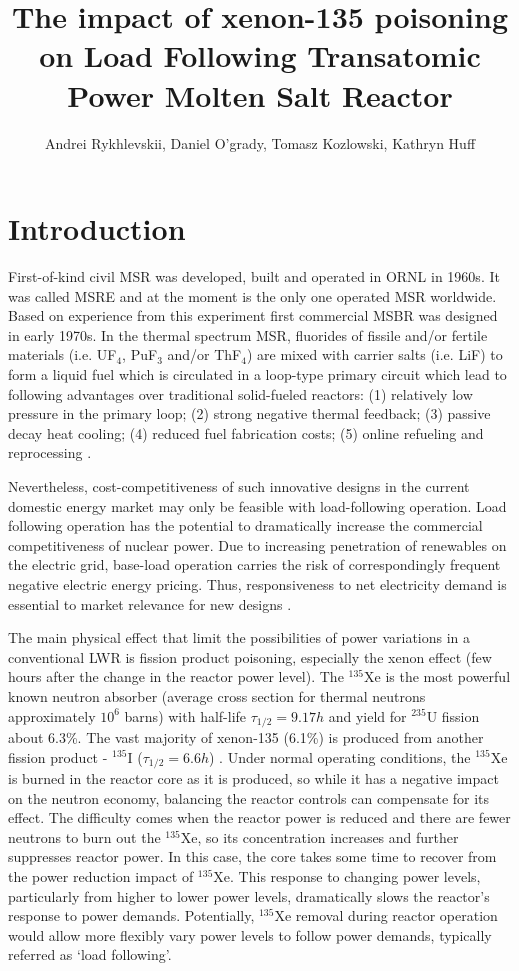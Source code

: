 \documentclass{anstrans}
\title{The impact of xenon-135 poisoning on Load Following Transatomic Power 
Molten Salt Reactor}
\author{Andrei Rykhlevskii, Daniel O'grady, Tomasz Kozlowski, Kathryn Huff}
\institute{
        Department of Nuclear, Plasma, and Radiological Engineering, University 
        of Illinois at Urbana-Champaign \break
        Urbana, IL
}
\begin{document}
\section{Introduction}
First-of-kind civil \gls{MSR} was developed, built and operated in \gls{ORNL}  
in 1960s. It was called \gls{MSRE} and at the moment is the
only one operated 
\gls{MSR} worldwide. Based on experience from this experiment first commercial
\gls{MSBR} was designed in early 1970s. In the thermal spectrum \gls{MSR}, 
fluorides of fissile and/or fertile materials (i.e.
UF$_4$, PuF$_3$ and/or 
ThF$_4$) are mixed with carrier salts (i.e. LiF) to form a liquid fuel
which 
is circulated in a loop-type primary circuit which lead to following 
advantages over traditional solid-fueled reactors: (1) relatively low pressure 
in the primary loop; (2) strong negative thermal feedback; (3) passive decay 
heat cooling; (4) reduced fuel fabrication costs; (5) online refueling and 
reprocessing \cite{haubenreich_experience_1970}.

Nevertheless, cost-competitiveness of such innovative designs in the current 
domestic energy market may only be feasible with load-following operation. 
Load following operation has the potential to dramatically increase the 
commercial competitiveness of nuclear power. Due to increasing penetration of 
renewables on the electric grid, base-load operation carries the risk of 
correspondingly frequent negative electric energy pricing. Thus, 
responsiveness to net electricity demand is essential to market relevance for
new designs \cite{energy_information_administration_u.s._2016}.

The main physical effect that limit the possibilities of power variations in a 
conventional \gls{LWR} is fission product poisoning, especially the xenon  
effect (few hours after the change in the reactor power level).  The 
$^{135}$Xe is the most powerful known neutron absorber (average cross section 
for thermal neutrons approximately $10^6$ barns) with half-life  
$\tau_{1/2}=9.17h$ and yield for $^{235}$U fission about 6.3\%. The vast 
majority of xenon-135 (6.1\%) is produced from another fission product - 
$^{135}$I ($\tau_{1/2}=6.6h$) \cite{lokhov_technical_2011}. Under normal 
operating conditions, the $^{135}$Xe is burned in the reactor core as it is 
produced, so while it has a negative impact on the neutron economy, balancing 
the reactor controls can compensate for its effect. The difficulty comes when 
the reactor power is reduced and there are fewer neutrons to burn out the 
$^{135}$Xe, so its concentration increases and further suppresses reactor 
power. In this case, the core takes some time to recover from the power 
reduction impact of $^{135}$Xe. This response to changing power levels, 
particularly from higher to lower power levels, dramatically slows the 
reactor’s response to power demands. Potentially, $^{135}$Xe removal during 
reactor operation would allow more flexibly vary power levels to follow power 
demands, typically referred as `load following'.
\end{document}
